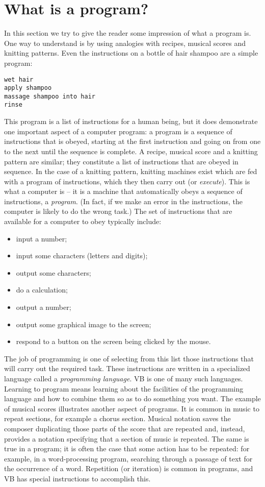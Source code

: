 	\section{What is a program?}
		In this section we try to give the reader some impression of what a program is. One way to understand is by using analogies with recipes, musical scores and knitting patterns. Even the instructions on a bottle of hair shampoo are a simple program:
		\begin{lstlisting}
wet hair
apply shampoo
massage shampoo into hair
rinse
		\end{lstlisting}
		This program is a list of instructions for a human being, but it does demonstrate one important aspect of a computer program: a program is a sequence of instructions that is obeyed, starting at the first instruction and going on from one to the next until the sequence is complete. A recipe, musical score and a knitting pattern are similar; they constitute a list of instructions that are obeyed in sequence. In the case of a knitting pattern, knitting machines exist which are fed with a program of instructions, which they then carry out (or \emph{execute}). This is what a computer is – it is a machine that automatically obeys a sequence of instructions, a \emph{program}. (In fact, if we make an error in the instructions, the computer is likely to do the wrong task.) The set of instructions that are available for a computer to obey typically include:
		\begin{itemize}
			\item	input a number;
			\item	input some characters (letters and digits);
			\item	output some characters;
			\item	do a calculation;
			\item	output a number;
			\item	output some graphical image to the screen;
			\item	respond to a button on the screen being clicked by the mouse.
		\end{itemize}
		The job of programming is one of selecting from this list those instructions that will carry out the required task. These instructions are written in a specialized language called a \emph{programming language}. VB is one of many such languages. Learning to program means learning about the facilities of the programming language and how to combine them so as to do something you want. The example of musical scores illustrates another aspect of programs. It is common in music to repeat sections, for example a chorus section. Musical notation saves the composer duplicating those parts of the score that are repeated and, instead, provides a notation specifying that a section of music is repeated. The same is true in a program; it is often the case that some action has to be repeated: for example, in a word-processing program, searching through a passage of text for the occurrence of a word. Repetition (or iteration) is common in programs, and VB has special instructions to accomplish this.
		
